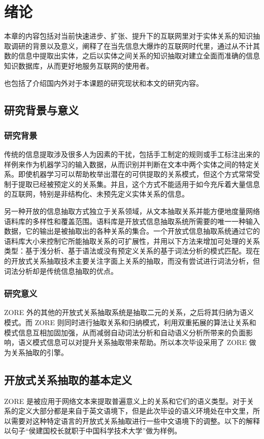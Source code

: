 \chapter{绪论}
\label{chap:introduction}

本章的内容包括对当前快速进步、扩张、提升下的互联网里对于实体关系的知识抽取调研的背景以及意义，阐释了在当先信息大爆炸的互联网时代里，通过从不计其数的信息中提取出实体，之后以实体之间关系的知识抽取对建立全面而准确的信息知识数据库，从而更好地服务互联网的使用者。

也包括了介绍国内外对于本课题的研究现状和本文的研究内容。

\section{研究背景与意义}

\subsection{研究背景}

传统的信息提取涉及很多人为因素的干扰，包括手工制定的规则或手工标注出来的样例来作为机器学习的输入数据，从而识别并判断在文本中两个实体之间的特定关系\citep{wang}。即使机器学习可以帮助枚举出潜在的可供提取的关系模式，但这个方式常常受制于提取已经被预定义的关系集。并且，这个方式不能适用于如今充斥着大量信息的互联网，特别是非结构化、未预先定义实体关系的信息。

另一种开放的信息抽取\citep{banko}方式独立于关系领域，从文本抽取关系并能方便地度量网络语料库的多样性和覆盖范围。语料库是开放式信息抽取系统所需要的唯一一种输入数据，它的输出是被抽取出的各种关系的集合。一个开放式信息抽取系统通过它的语料库大小来控制它所能抽取关系的可扩展性，并用以下方法来增加可处理的关系类型：基于浅分析、基于语法或没有预定义关系的基于词法分析的模式匹配\citep{wu2010, naka2012, etz2011}。现在的开放式关系抽取技术主要关注字面上关系的抽取，而没有尝试进行词法分析，但词法分析却是传统信息抽取的优点。

\subsection{研究意义}
ZORE 外的其他的开放式关系抽取系统是抽取二元的关系，之后将其归纳为语义模式。而 ZORE 则同时进行抽取关系和归纳模式，利用双重拓展的算法让关系和模式信息互相加固加强，从而减弱自动词法分析和自动语义分析所带来的负面影响，语义模式信息可以对提升关系抽取带来帮助。所以本次毕设采用了 ZORE 做为关系抽取的引擎。

\section{开放式关系抽取的基本定义}
ZORE 是被应用于网络文本来提取普遍意义上的关系和它们的语义类型。对于关系的定义大部分都是来自于英文语境下，但是此次毕设的语义环境处在中文里，所以需要对这种特定语言的开放式关系抽取进行一些中文语境下的调整。以下的解释以句子“侯建国校长就职于中国科学技术大学”做为样例。


